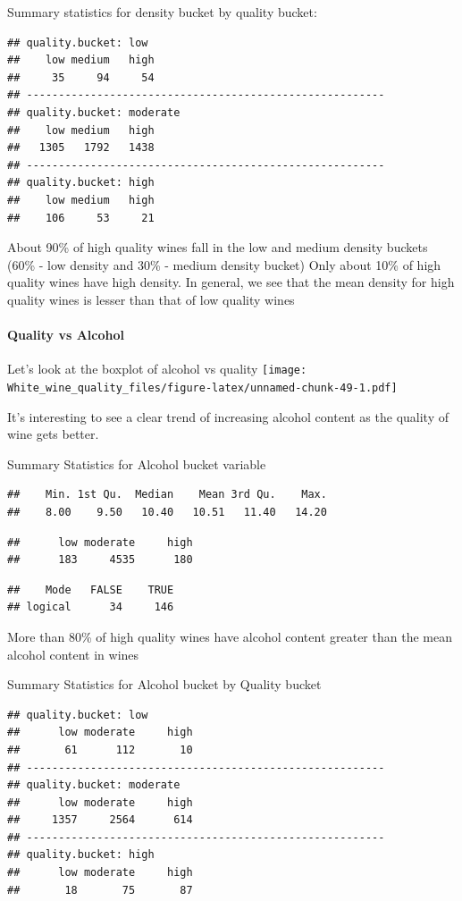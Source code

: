 \documentclass[]{article}
\let\oldparagraph\paragraph
\renewcommand{\paragraph}[1]{\oldparagraph{#1}\mbox{}}
\begin{document}
Summary statistics for density bucket by quality bucket:

\begin{verbatim}
## quality.bucket: low
##    low medium   high 
##     35     94     54 
## -------------------------------------------------------- 
## quality.bucket: moderate
##    low medium   high 
##   1305   1792   1438 
## -------------------------------------------------------- 
## quality.bucket: high
##    low medium   high 
##    106     53     21
\end{verbatim}

About 90\% of high quality wines fall in the low and medium density
buckets (60\% - low density and 30\% - medium density bucket) Only about
10\% of high quality wines have high density. In general, we see that
the mean density for high quality wines is lesser than that of low
quality wines

\paragraph{Quality vs Alcohol}\label{quality-vs-alcohol}

Let's look at the boxplot of alcohol vs quality
\texttt{[image: White\_wine\_quality\_files/figure-latex/unnamed-chunk-49-1.pdf]}

It's interesting to see a clear trend of increasing alcohol content as
the quality of wine gets better.

Summary Statistics for Alcohol bucket variable

\begin{verbatim}
##    Min. 1st Qu.  Median    Mean 3rd Qu.    Max. 
##    8.00    9.50   10.40   10.51   11.40   14.20
\end{verbatim}

\begin{verbatim}
##      low moderate     high 
##      183     4535      180
\end{verbatim}

\begin{verbatim}
##    Mode   FALSE    TRUE 
## logical      34     146
\end{verbatim}

More than 80\% of high quality wines have alcohol content greater than
the mean alcohol content in wines

Summary Statistics for Alcohol bucket by Quality bucket

\begin{verbatim}
## quality.bucket: low
##      low moderate     high 
##       61      112       10 
## -------------------------------------------------------- 
## quality.bucket: moderate
##      low moderate     high 
##     1357     2564      614 
## -------------------------------------------------------- 
## quality.bucket: high
##      low moderate     high 
##       18       75       87
\end{verbatim}
\end{document}
